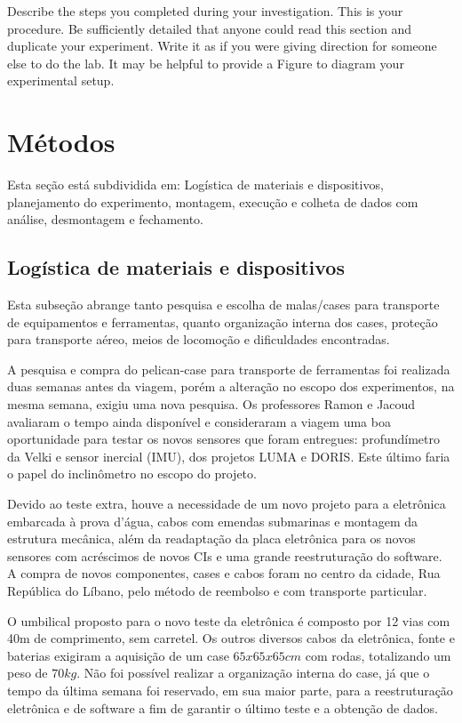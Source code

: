 
Describe the steps you completed during your investigation. This is your procedure. Be sufficiently detailed that anyone could read this section and duplicate your experiment. Write it as if you were giving direction for someone else to do the lab. It may be helpful to provide a Figure to diagram your experimental setup.


\section{Métodos}
Esta seção está subdividida em: Logística de materiais e dispositivos,
planejamento do experimento, montagem, execução e colheta de dados com análise,
desmontagem e fechamento.

\subsection{Logística de materiais e dispositivos}
Esta subseção abrange tanto pesquisa e escolha de malas/cases para
transporte de equipamentos e ferramentas, quanto organização interna dos
cases, proteção para transporte aéreo, meios de locomoção e dificuldades
encontradas.

A pesquisa e compra do pelican-case para transporte de ferramentas foi
realizada duas semanas antes da viagem, porém a alteração no escopo dos experimentos, na mesma
semana, exigiu uma nova pesquisa. Os professores Ramon e Jacoud avaliaram o
tempo ainda disponível e consideraram a viagem uma boa oportunidade para testar
os novos sensores que foram entregues:
profundímetro da Velki e sensor inercial (IMU), dos projetos LUMA e DORIS. Este
último faria o papel do inclinômetro no escopo do projeto. 

Devido ao teste extra, houve a necessidade de um novo projeto para a eletrônica
embarcada à prova d'água, cabos com emendas submarinas e montagem da estrutura mecânica, além da readaptação da placa eletrônica para os novos sensores com acréscimos de novos
CIs e uma grande reestruturação do software. A compra de novos componentes,
cases e cabos foram no centro da cidade, Rua República do Líbano, pelo método de
reembolso e com transporte particular.

O umbilical proposto para o novo teste da eletrônica é composto por 12 vias com
40m de comprimento, sem carretel. Os outros diversos cabos da eletrônica, fonte
e baterias exigiram a aquisição de um case $65x65x65cm$ com rodas, totalizando um
peso de $70kg$. Não foi possível realizar a organização interna do case, já que
o tempo da última semana foi reservado, em sua maior parte, para a
reestruturação eletrônica e de software a fim de garantir o último teste e a
obtenção de dados. 

